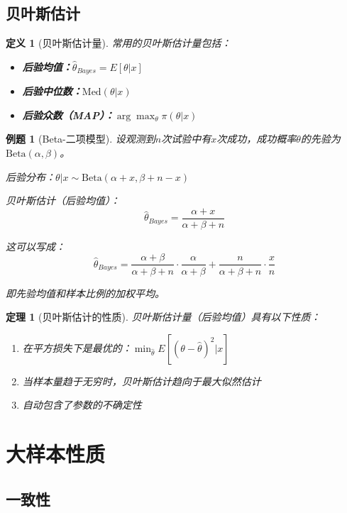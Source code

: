 \documentclass[12pt,a4paper]{article}
\newtheorem{theorem}{定理}[section]
\newtheorem{definition}{定义}[section]
\newtheorem{example}{例题}[section]
\theoremstyle{remark}
\begin{document}
\subsection{贝叶斯估计}

\begin{definition}[贝叶斯估计量]
常用的贝叶斯估计量包括：
\begin{itemize}
\item \textbf{后验均值：}$\hat{\theta}_{Bayes} = E[\theta|x]$
\item \textbf{后验中位数：}$\text{Med}(\theta|x)$
\item \textbf{后验众数（MAP）：}$\arg\max_\theta \pi(\theta|x)$
\end{itemize}
\end{definition}

\begin{example}[Beta-二项模型]
设观测到$n$次试验中有$x$次成功，成功概率$\theta$的先验为$\text{Beta}(\alpha, \beta)$。

后验分布：$\theta|x \sim \text{Beta}(\alpha + x, \beta + n - x)$

贝叶斯估计（后验均值）：
$$\hat{\theta}_{Bayes} = \frac{\alpha + x}{\alpha + \beta + n}$$

这可以写成：
$$\hat{\theta}_{Bayes} = \frac{\alpha + \beta}{\alpha + \beta + n} \cdot \frac{\alpha}{\alpha + \beta} + \frac{n}{\alpha + \beta + n} \cdot \frac{x}{n}$$

即先验均值和样本比例的加权平均。
\end{example}

\begin{theorem}[贝叶斯估计的性质]
贝叶斯估计量（后验均值）具有以下性质：
\begin{enumerate}
\item 在平方损失下是最优的：$\min_{\hat{\theta}} E[(\theta - \hat{\theta})^2|x]$
\item 当样本量趋于无穷时，贝叶斯估计趋向于最大似然估计
\item 自动包含了参数的不确定性
\end{enumerate}
\end{theorem}

\section{大样本性质}

\subsection{一致性}
\end{document}
